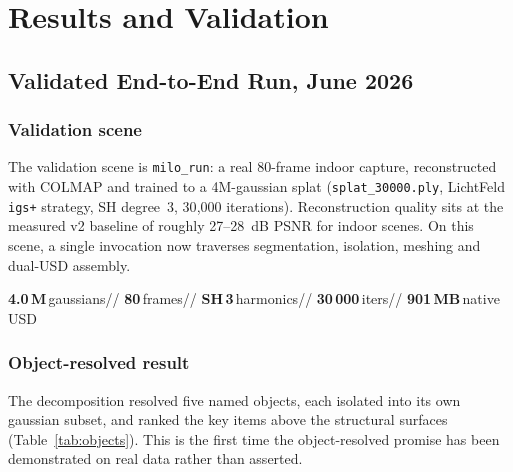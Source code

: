 \documentclass[a4paper,11pt]{report}
\newcommand{\code}[1]{\texttt{#1}}
\newcommand{\stat}[2]{{\color{salfordred}\bfseries #1}\,{\footnotesize #2}}
\begin{document}
\part{Results and Validation}

\chapter{Validated End-to-End Run, June 2026}

\section{Validation scene}
The validation scene is \code{milo\_run}: a real 80-frame indoor capture, reconstructed with COLMAP and
trained to a 4M-gaussian splat (\code{splat\_30000.ply}, LichtFeld \code{igs+} strategy, SH degree~3,
30{,}000 iterations). Reconstruction quality sits at the measured v2 baseline of roughly 27--28~dB PSNR for
indoor scenes. On this scene, a single invocation now traverses segmentation, isolation, meshing and
dual-USD assembly.

\begin{center}\large
\stat{4.0\,M}{gaussians}\quad\textcolor{salfordgold}{/\!/}\quad
\stat{80}{frames}\quad\textcolor{salfordgold}{/\!/}\quad
\stat{SH\,3}{harmonics}\quad\textcolor{salfordgold}{/\!/}\quad
\stat{30\,000}{iters}\quad\textcolor{salfordgold}{/\!/}\quad
\stat{901\,MB}{native USD}
\end{center}

\section{Object-resolved result}
The decomposition resolved five named objects, each isolated into its own gaussian subset, and ranked the
key items above the structural surfaces (Table~\ref{tab:objects}). This is the first time the
object-resolved promise has been demonstrated on real data rather than asserted.
\end{document}
